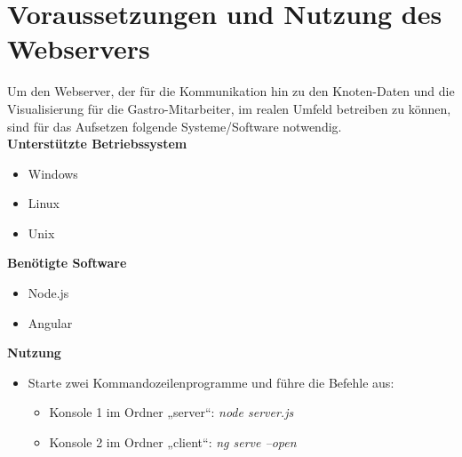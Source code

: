 \section{Voraussetzungen und Nutzung des Webservers}
Um den Webserver, der für die Kommunikation hin zu den Knoten-Daten und die Visualisierung für die Gastro-Mitarbeiter, im realen Umfeld betreiben zu können, sind für das Aufsetzen folgende Systeme/Software notwendig.\\

\noindent
\textbf{Unterstützte Betriebssystem}
\begin{itemize}
    \item Windows
    \item Linux
    \item Unix
\end{itemize} 
\textbf{Benötigte Software}
\begin{itemize}
    \item Node.js
    \item Angular
\end{itemize} 
\textbf{Nutzung}
\begin{itemize}
    \item Starte zwei Kommandozeilenprogramme und führe die Befehle aus:
    \begin{itemize}
        \item Konsole 1 im Ordner „server“: \textit{node server.js} 
        \item Konsole 2 im Ordner „client“: \textit{ng serve --open}
    \end{itemize}
\end{itemize} 
\newpage
